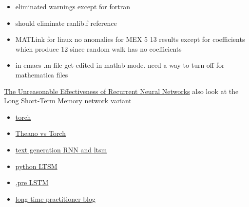 \documentclass[hyperref]{labbook}
\begin{document}
  \begin{itemize}
  \item eliminated warnings except for fortran 
  \item should eliminate ranlib.f reference
  \end{itemize}
\begin{itemize}
\item MATLink for linux  no anomalies for MEX 5  13 results except for coefficients which produce 12 since random walk has no coefficients
\item in emacs .m file get edited in matlab mode.  need a way to turn off for mathematica files
\end{itemize}


\href{http://karpathy.github.io/2015/05/21/rnn-effectiveness/}{The Unreasonable Effectiveness of Recurrent Neural Networks}  also look at the Long Short-Term Memory network variant
\begin{itemize}
\item \href{http://torch.ch/}{torch}
\item \href{http://fastml.com/torch-vs-theano/}{Theano vs Torch}
\item \href{https://chunml.github.io/ChunML.github.io/project/Creating-Text-Generator-Using-Recurrent-Neural-Network/}{text generation RNN and ltsm}
\item \href{http://machinelearningmastery.com/text-generation-lstm-recurrent-neural-networks-python-keras/}{python LTSM}
\item \href{https://medium.com/@TalPerry/deep-learning-the-stock-market-df853d139e02}{,pre LSTM}
\item \href{https://ehudreiter.com/2016/12/12/nlg-and-ml/}{long time practitioner blog}
\end{itemize}

\end{document}

